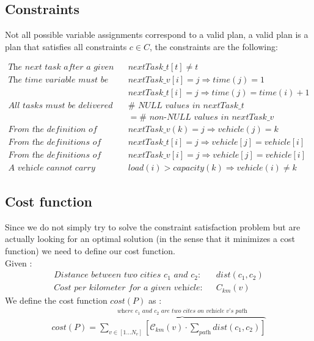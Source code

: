 \documentclass[11pt]{article}
\begin{document}
\subsection{Constraints}
Not all possible variable assignments correspond to a valid plan, a valid plan is a plan that satisfies all constraints $c\in C$, the constraints are the following:

\begin{align*}
    \textit{The next task after a given task t cannot be itself} 
    && nextTask\_t[t] \neq t \\
    \textit{The time variable must be coherent} 
    && nextTask\_v[i] = j \Rightarrow time(j) = 1 \\
    \textit{} && nextTask\_t[i] = j \Rightarrow time(j) = time(i)+1 \\
    \textit{All tasks must be delivered} && \#\textit{ NULL values in nextTask\_t}\\ && = \#\textit{ non-NULL values in nextTask\_v} \\
    \textit{From the definition of vehicle} && nextTask\_v(k) = j \Rightarrow vehicle(j) = k \\
    \textit{From the definitions of nextTask\_t and vehicle} && nextTask\_t[i] = j \Rightarrow vehicle[j] = vehicle[i] \\
    \textit{From the definitions of nextTask\_v and vehicle} && nextTask\_v[i] = j \Rightarrow vehicle[j] = vehicle[i] \\
    \textit{A vehicle cannot carry more than it's capacity} && load(i) > capacity(k) \Rightarrow vehicle(i) \neq k
\end{align*}

\subsection{Cost function}
Since we do not simply try to solve the constraint satisfaction problem but are actually looking for an optimal solution (in the sense that it minimizes a cost function) we need to define our cost function. \\

Given :
\begin{align*}
    \textit{Distance between two cities $c_1$ and $c_2$:} && dist(c_1,c_2) \\
    \textit{Cost per kilometer for a given vehicle:} && \textit{C}_{km} (v)
\end{align*}
We define the cost function $cost(P)$ as :
\begin{align*}
    cost(P) =  \overbrace{  \sum_{v \in [1...N_v]}  \left[ \mathcal{C}_{km}(v) \cdot  \sum_{\textit{path}} dist(c_1,c_2) \right]}^{\textit{where $c_1$ and $c_2$ are two cites on vehicle v's path}}
\end{align*}
\end{document}
